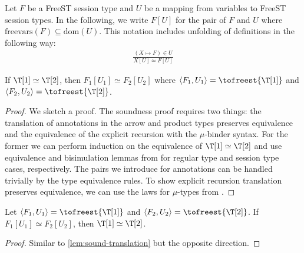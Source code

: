 
Let $F$ be a FreeST session type and $U$ be a mapping from variables to FreeST
session types. In the following, we write $F[U]$ for the pair of $F$ and $U$
where $\text{freevars}(F) \subseteq \text{dom}(U)$. This notation includes
unfolding of definitions in the following way:
\begin{gather*}
  \frac{(X \mapsto F) \in U}{X[U] \simeq F[U]}
\end{gather*}

\begin{lemma}
  If $\T[1] \simeq \T[2]$, then $F_1 [U_1] \simeq F_2 [U_2]$
  where $\langle F_1, U_1 \rangle = \tofreest{\T[1]}$ and
  $\langle F_2, U_2 \rangle = \tofreest{\T[2]}$.
  \label{lem:sound-translation}
\end{lemma}
\begin{proof}
  We sketch a proof. The soundness proof requires two things: the translation of
  annotations in the arrow and product types preserves equivalence and the
  equivalence of the explicit recursion with the $\mu$-binder syntax. For the
  former we can perform induction on the equivalence of $\T[1] \simeq \T[2]$ and
  use equivalence and bisimulation lemmas from \citet{DBLP:conf/icfp/ThiemannV16}
  for regular type and session type cases, respectively. The pairs we introduce
  for annotations can be handled trivially by the type equivalence rules. To
  show explicit recursion translation preserves equivalence, we can use the laws
  for $\mu$-types from \citet{DBLP:conf/icfp/ThiemannV16}. 
\end{proof}

\begin{lemma}
  Let $\langle F_1, U_1 \rangle = \tofreest{\T[1]}$ and
  $\langle F_2, U_2 \rangle = \tofreest{\T[2]}$. If
  $F_1 [U_1] \simeq F_2 [U_2]$, then $\T[1] \simeq \T[2]$.
\end{lemma}
\begin{proof}
  Similar to \ref{lem:sound-translation} but the opposite direction.
\end{proof}

